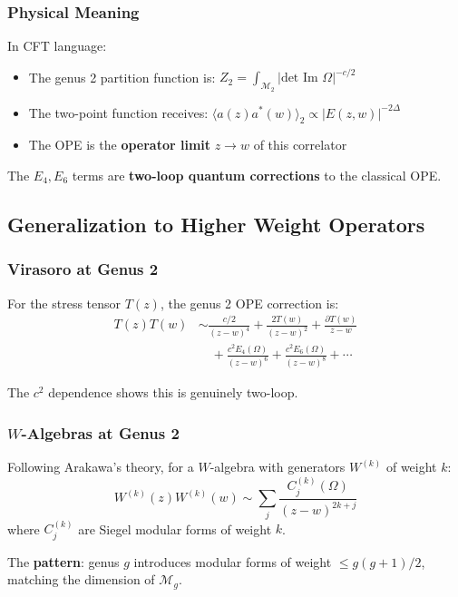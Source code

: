 \subsubsection{Physical Meaning}

In CFT language:
\begin{itemize}
\item The genus 2 partition function is: 
$Z_2 = \int_{\mathcal{M}_2} |\text{det Im } \Omega|^{-c/2}$

\item The two-point function receives:
$\langle a(z) a^*(w) \rangle_2 \propto |E(z,w)|^{-2\Delta}$

\item The OPE is the \textbf{operator limit} $z \to w$ of this correlator
\end{itemize}

The $E_4, E_6$ terms are \textbf{two-loop quantum corrections} to the classical OPE.

\subsection{Generalization to Higher Weight Operators}

\subsubsection{Virasoro at Genus 2}

For the stress tensor $T(z)$, the genus 2 OPE correction is:
\begin{align}
T(z) T(w) &\sim \frac{c/2}{(z-w)^4} + \frac{2T(w)}{(z-w)^2} + \frac{\partial T(w)}{z-w} \\
&\quad + \frac{c^2 E_4(\Omega)}{(z-w)^6} + \frac{c^2 E_6(\Omega)}{(z-w)^8} + \cdots
\end{align}

The $c^2$ dependence shows this is genuinely two-loop.

\subsubsection{$W$-Algebras at Genus 2}

Following Arakawa's theory, for a $W$-algebra with generators $W^{(k)}$ of weight $k$:
$$W^{(k)}(z) W^{(k)}(w) \sim \sum_{j} \frac{C_j^{(k)}(\Omega)}{(z-w)^{2k+j}}$$
where $C_j^{(k)}$ are Siegel modular forms of weight $k$.

The \textbf{pattern}: genus $g$ introduces modular forms of weight $\leq g(g+1)/2$,
matching the dimension of $\mathcal{M}_g$.

